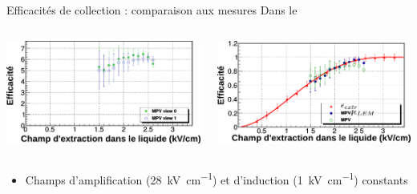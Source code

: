     \begin{frame}{Efficacités de collection : comparaison aux mesures}
        Dans le \TOO{}
        \begin{scriptsize}
            \begin{columns}
                \begin{column}{0.5\textwidth}
                    \includegraphics[width=\textwidth]{./pictures/gain_vs_extr.pdf}
                \end{column}
                \begin{column}{0.5\textwidth}
                    \includegraphics[width=\textwidth]{./pictures/comp_311_eff.pdf}
                \end{column}
            \end{columns}\vspace{0.5cm}
            \begin{columns}
                \begin{column}{0.5\textwidth}
                    \begin{itemize}
                        \item Champs d'amplification (\SI{28}{\kilo\volt\per\centi\meter}) et d'induction (\SI{1}{\kilo\volt\per\centi\meter}) constants

\end{itemize}
\end{column}
\end{columns}
\end{scriptsize}
\end{frame}
